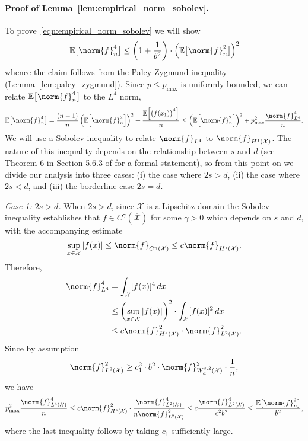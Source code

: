 \documentclass[twoside]{article}
\newcommand{\abs}[1]{\left \lvert #1 \right \rvert}
\newcommand{\1}{\mathbf{1}}
\newcommand{\Xset}{\mathcal{X}}
\newcommand{\Leb}{L}
\newcommand{\Ebb}{\mathbb{E}}
\theoremstyle{definition}
\theoremstyle{remark}
\begin{document}
\paragraph{Proof of Lemma~\ref{lem:empirical_norm_sobolev}.}
To prove~\eqref{eqn:empirical_norm_sobolev} we will show
\begin{equation*}
\mathbb{E}\bigl[\norm{f}_n^4\bigr] \leq \left(1 + \frac{1}{b^2}\right)\cdot \left(\mathbb{E}\bigl[\norm{f}_n^2\bigr]\right)^2
\end{equation*}
whence the claim follows from the Paley-Zygmund inequality (Lemma~\ref{lem:paley_zygmund}). Since $p \leq p_{\max}$ is uniformly bounded, we can relate $\mathbb{E}\bigl[\norm{f}_n^4\bigr]$ to the $\Leb^4$ norm,
\begin{equation*}
\mathbb{E}\bigl[\norm{f}_n^4\bigr] = \frac{(n-1)}{n}\left(\mathbb{E}\Bigl[\norm{f}_n^2\Bigr]\right)^2 + \frac{\mathbb{E}\Bigl[\bigl(f(x_1)\bigr)^4\Bigr]}{n} \leq \left(\mathbb{E}\Bigl[\norm{f}_n^2\Bigr]\right)^2 + p_{\max}^2\frac{\norm{f}_{\Leb^4}^4}{n}.
\end{equation*}
We will use a Sobolev inequality to relate $\norm{f}_{\Leb^4}$ to $\norm{f}_{H^1(\Xset)}$. The nature of this inequality depends on the relationship between $s$ and $d$ (see Theorem 6 in Section 5.6.3 of \cite{evans10} for a formal statement), so from this point on we divide our analysis into three cases: (i) the case where $2s > d$, (ii) the case where $2s < d$, and (iii) the borderline case $2s = d$.

\textit{Case 1: $2s > d$.}
When $2s > d$, since $\Xset$ is a Lipschitz domain the Sobolev inequality establishes that $f \in C^{\gamma}(\overline{\Xset})$ for some $\gamma > 0$ which depends on $s$ and $d$, with the accompanying estimate
\begin{equation*}
\sup_{x \in \Xset} \abs{f(x)} \leq \norm{f}_{C^{\gamma}(\Xset)} \leq c \norm{f}_{H^s(\Xset)}.
\end{equation*}
Therefore,
\begin{align*}
\norm{f}_{\Leb^4}^4 & = \int_{\Xset} [f(x)]^4 \,dx \\
& \leq \left(\sup_{x \in \Xset} \abs{f(x)}\right)^2 \cdot \int_{\Xset} [f(x)]^2 \,dx \\
& \leq c \norm{f}_{H^s(\Xset)}^2 \cdot \norm{f}_{\Leb^2(\Xset)}^2.
\end{align*}
Since by assumption
\begin{equation*}
\norm{f}_{\Leb^2(\Xset)}^2 \geq c_1^2 \cdot b^2 \cdot \norm{f}_{W_d^{s,2}(\Xset)}^2 \cdot \frac{1}{n},
\end{equation*}
we have
\begin{equation*}
p_{\max}^2\frac{\norm{f}_{\Leb^4(\Xset)}^4}{n} \leq c \norm{f}_{H^s(\Xset)}^2 \cdot \frac{\norm{f}_{\Leb^2(\Xset)}^4}{n \norm{f}_{\Leb^2(\Xset)}^2} \leq c \frac{\norm{f}_{\Leb^2(\Xset)}^4}{c_1^2 b^2} \leq \frac{\Ebb\bigl[\norm{f}_n^2\bigr]}{b^2},
\end{equation*}
where the last inequality follows by taking $c_1$ sufficiently large.
\end{document}
